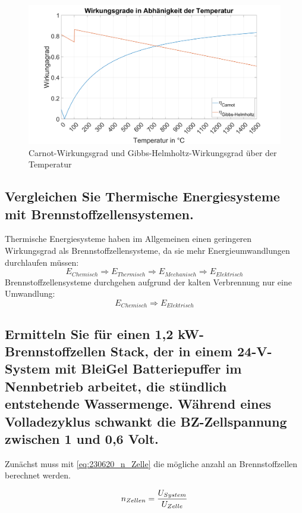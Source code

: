 \begin{figure}[H]
    \centering
    \includegraphics[width=\textwidth]{Abbildungen/Wirkungsgrade.png}
    \caption{Carnot-Wirkungsgrad und Gibbs-Helmholtz-Wirkungsgrad über der Temperatur}
    \label{fig:230620_Wirkungsgrade}
\end{figure}

\subsection{Vergleichen Sie Thermische Energiesysteme mit Brennstoffzellensystemen.}

Thermische Energiesysteme haben im Allgemeinen einen geringeren Wirkungsgrad als Brennstoffzellensysteme, da sie  mehr Energieumwandlungen durchlaufen müssen:
$$E_{Chemisch} \Rightarrow E_{Thermisch} \Rightarrow E_{Mechanisch} \Rightarrow E_{Elektrisch}$$ 
Brennstoffzellensysteme durchgehen aufgrund der kalten Verbrennung nur eine Umwandlung:
$$E_{Chemisch} \Rightarrow E_{Elektrisch}$$

\subsection{Ermitteln Sie für einen 1,2 kW-Brennstoffzellen Stack, der in einem 24-V-System mit
BleiGel Batteriepuffer im Nennbetrieb arbeitet, die stündlich entstehende Wassermenge.
Während eines Volladezyklus schwankt die BZ-Zellspannung zwischen 1 und 0,6 Volt.}
\label{sec:VF_H2O_Menge}

Zunächst muss mit \autoref{eq:230620_n_Zelle} die mögliche anzahl an Brennstoffzellen berechnet werden.

\begin{equation}
    n_{Zellen} = \frac{U_{System}}{U_{Zelle}}\\
    \label{eq:230620_n_Zelle}
\end{equation}

